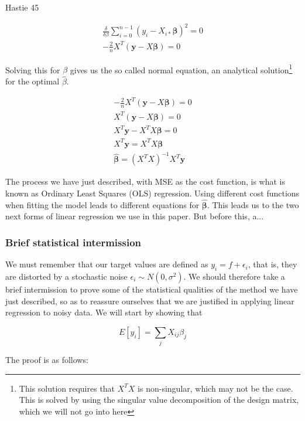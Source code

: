 \documentclass[twocolumn,10pt,cleanfoot]{asme2ej}
\begin{document}
Hastie 45

\begin{gather}
\frac{\delta}{\delta \beta} \sum_{i=0}^{n-1}(y_i-X_{i*}\bm{\beta})^2 = 0 \\
 - \frac{2}{n} X^T(\bm{y} - X\bm{\beta}) = 0
\end{gather}

Solving this for $\beta$ gives us the so called normal equation, an analytical solution\footnote{This solution requires that $X^TX$ is non-singular, which may not be the case. This is solved by using the singular value decomposition of the design matrix, which we will not go into here} for the optimal $\hat{\beta}$.

\begin{gather}
- \frac{2}{n} X^T(\bm{y} - X\bm{\beta}) = 0 \\
X^T(\bm{y} - X\bm{\beta}) = 0 \\
X^T\bm{y} - X^TX\bm{\beta} = 0 \\
X^T\bm{y} = X^TX\bm{\beta} \\
\bm{\hat{\beta}} = (X^TX)^{-1}X^T\bm{y}
\end{gather}

The process we have just described, with MSE as the cost function, is what is known as Ordinary Least Squares (OLS) regression. Using different cost functions when fitting the model leads to different equations for $\bm{\hat{\beta}}$. This leads us to the two next forms of linear regression we use in this paper. But before this, a...

\subsubsection{Brief statistical intermission}

We must remember that our target values are defined as $y_i = f + \epsilon_i$, that is, they are distorted by a stochastic noise $\epsilon_i \sim N(0,\sigma^2)$. We should therefore take a brief intermission to prove some of the statistical qualities of the method we have just described, so as to reassure ourselves that we are justified in applying linear regression to noisy data. We will start by showing that

\begin{equation}
E[y_i] = \sum_j X_{ij}\beta_j
\end{equation}

The proof is as follows:
\end{document}
